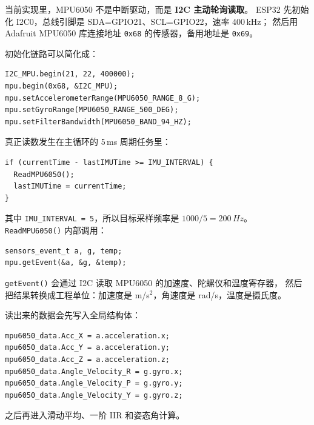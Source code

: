 \documentclass[UTF8,11pt,a4paper]{ctexart}
\begin{document}
\begin{candidate}
当前实现里，MPU6050 不是中断驱动，而是 \textbf{I2C 主动轮询读取}。
ESP32 先初始化 I2C0，总线引脚是 SDA=GPIO21、SCL=GPIO22，速率 400\,kHz；
然后用 Adafruit MPU6050 库连接地址 \texttt{0x68} 的传感器，备用地址是 \texttt{0x69}。

\medskip
初始化链路可以简化成：
\begin{lstlisting}
I2C_MPU.begin(21, 22, 400000);
mpu.begin(0x68, &I2C_MPU);
mpu.setAccelerometerRange(MPU6050_RANGE_8_G);
mpu.setGyroRange(MPU6050_RANGE_500_DEG);
mpu.setFilterBandwidth(MPU6050_BAND_94_HZ);
\end{lstlisting}

\medskip
真正读数发生在主循环的 5\,ms 周期任务里：
\begin{lstlisting}
if (currentTime - lastIMUTime >= IMU_INTERVAL) {
  ReadMPU6050();
  lastIMUTime = currentTime;
}
\end{lstlisting}
其中 \texttt{IMU\_INTERVAL = 5}，所以目标采样频率是 $1000/5 = 200\,Hz$。
\texttt{ReadMPU6050()} 内部调用：
\begin{lstlisting}
sensors_event_t a, g, temp;
mpu.getEvent(&a, &g, &temp);
\end{lstlisting}
\texttt{getEvent()} 会通过 I2C 读取 MPU6050 的加速度、陀螺仪和温度寄存器，
然后把结果转换成工程单位：加速度是 m/s$^2$，角速度是 rad/s，温度是摄氏度。

\medskip
读出来的数据会先写入全局结构体：
\begin{lstlisting}
mpu6050_data.Acc_X = a.acceleration.x;
mpu6050_data.Acc_Y = a.acceleration.y;
mpu6050_data.Acc_Z = a.acceleration.z;
mpu6050_data.Angle_Velocity_R = g.gyro.x;
mpu6050_data.Angle_Velocity_P = g.gyro.y;
mpu6050_data.Angle_Velocity_Y = g.gyro.z;
\end{lstlisting}
之后再进入滑动平均、一阶 IIR 和姿态角计算。
\end{candidate}
\end{document}
